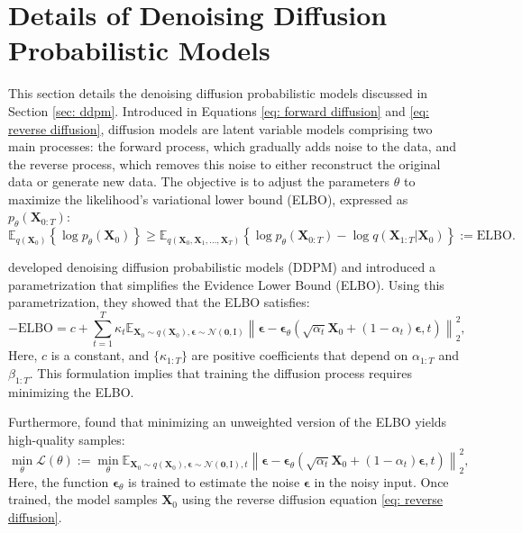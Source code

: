 \documentclass[11pt]{article}
\begin{document}
\section{Details of Denoising Diffusion Probabilistic Models}\label{sec: DDPM details}
This section details the denoising diffusion probabilistic models discussed in Section \ref{sec: ddpm}.
Introduced in Equations \ref{eq: forward diffusion} and \ref{eq: reverse diffusion}, diffusion models are latent variable models comprising two main processes: the forward process, which gradually adds noise to the data, and the reverse process, which removes this noise to either reconstruct the original data or generate new data.
The objective is to adjust the parameters $\theta$ to maximize the likelihood's variational lower bound (ELBO), expressed as $p_{\theta}(\mathbf{X}_{0:T})$:
\begin{equation}
    \mathbb{E}_{q(\mathbf{X}_0)}\left\{\log p_{\theta}(\mathbf{X}_0)\right\} \geq \mathbb{E}_{q(\mathbf{X}_0,\mathbf{X}_1,\ldots,\mathbf{X}_T)}\left\{\log p_{\theta}(\mathbf{X}_{0:T})-\log q(\mathbf{X}_{1:T}|\mathbf{X}_0)\right\} := \text{ELBO}.
\end{equation}

\citet{ho2020denoising} developed denoising diffusion probabilistic models (DDPM) and introduced a parametrization that simplifies the Evidence Lower Bound (ELBO). Using this parametrization, they showed that the ELBO satisfies:
\begin{equation}
    -\text{ELBO} = c + \sum_{t=1}^T \kappa_t \mathbb{E}_{\mathbf{X}_0 \sim q(\mathbf{X}_0), \boldsymbol{\epsilon} \sim \mathcal{N}(\mathbf{0}, \bm{\mathrm{I}})}\left\|\boldsymbol{\epsilon} - \boldsymbol{\epsilon}_\theta\left(\sqrt{\alpha_t} \mathbf{X}_0 + (1-\alpha_t) \boldsymbol{\epsilon}, t\right)\right\|_2^2,
\end{equation}
Here, $c$ is a constant, and $\{\kappa_{1:T}\}$ are positive coefficients that depend on $\alpha_{1:T}$ and $\beta_{1:T}$. This formulation implies that training the diffusion process requires minimizing the ELBO.

Furthermore, \citet{ho2020denoising} found that minimizing an unweighted version of the ELBO yields high-quality samples:
\begin{equation}
    \min_{\theta} \mathcal{L}(\theta) := \min_{\theta} \mathbb{E}_{\mathbf{X}_0 \sim q(\mathbf{X}_0), \boldsymbol{\epsilon} \sim \mathcal{N}(\mathbf{0}, \bm{\mathrm{I}}), t}\left\|\boldsymbol{\epsilon} - \boldsymbol{\epsilon}_\theta\left(\sqrt{\alpha_t} \mathbf{X}_0 + (1-\alpha_t) \boldsymbol{\epsilon}, t\right)\right\|_2^2,
\end{equation}
Here, the function $\boldsymbol{\epsilon}_{\theta}$ is trained to estimate the noise $\boldsymbol{\epsilon}$ in the noisy input. Once trained, the model samples $\mathbf{X}_0$ using the reverse diffusion equation \ref{eq: reverse diffusion}.
\end{document}
